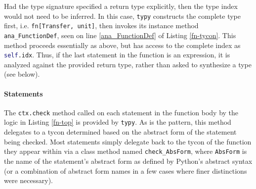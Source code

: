 \documentclass{sigplanconf}
\newcommand{\lip}[1]{\lstinline[language=Python,basicstyle=\ttfamily\small,deletendkeywords={tuple,buffer,map}]{#1}}
\begin{document}
Had the type signature specified a return type explicitly, then the type index would not need to be inferred. In this case, \lip{typy} constructs the complete type first, i.e. \lip{fn[Transfer, unit]}, then invokes its instance method \lip{ana_FunctionDef}, seen on line \ref{ana_FunctionDef} of Listing \ref{fn-tycon}. This method proceeds essentially as above, but has access to the complete index as \lip{self.idx}. Thus, if the last statement in the function is an expression, it is analyzed against the provided return type, rather than asked to synthesize a type (see below). %


\paragraph{Statements}
The \lip{ctx.check} method called on each statement in the function body by the logic in  Listing \ref{fn-top} is provided by \verb|typy|. As is the pattern, this method delegates to a tycon determined based on the abstract form of the statement being checked. Most statements simply delegate back to the tycon of the function they appear within via a class method named \lip{check_AbsForm}, where \lip{AbsForm} is the name of the statement's abstract form as defined by Python's abstract syntax (or a combination of abstract form names in a few cases where finer distinctions  were necessary).
\end{document}
